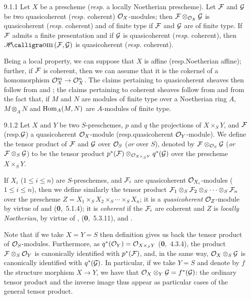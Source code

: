 
\begin{env}[Proposition]{9.1.1}
\label{prop-1.9.1.1}
Let $X$ be a prescheme
(\emph{resp.} a locally Noetherian prescheme). Let $\mathcal{F}$ and $\mathcal{G}$
be two quasicoherent (\emph{resp.} coherent) $\mathcal{O}_X$-modules; then
$\mathcal{F}\otimes_{\mathcal{O}_X}\mathcal{G}$ is quasicoherent (\emph{resp.} coherent) and
of finite type if $\mathcal{F}$ and $\mathcal{G}$ are of finite type. If
$\mathcal{F}$ admits a finite presentation and if $\mathcal{G}$ is quasicoherent
(\emph{resp.} coherent), then $\sheafHom(\sheaf{F},\sheaf{G})$ is quasicoherent
(\emph{resp.} coherent).
\end{env}

Being a local property, we can suppose that $X$ is affine (resp.Noetherian
affine); further, if $\mathcal{F}$ is coherent, then we can assume that it is the
cokernel of a homomorphism $\mathcal{O}_X^m\to\mathcal{O}_X^n$. The claims pertaining to
quasicoherent sheaves then follow from  and ; the
claims pertaining to coherent sheaves follow from  and from the fact
that, if $M$ and $N$ are modules of finite type over a Noetherian ring $A$,
$M\otimes_A N$ and $\operatorname{Hom}_A(M,N)$ are $A$-modules of finite type.

\begin{envr}[Definition]{9.1.2}
\label{defn-1.9.1.2}
Let $X$ and $Y$ be two $S$-preschemes, $p$ and
$q$ the projections of $X\times_S Y$, and $\mathcal{F}$ (resp.$\mathcal{G}$) a
quasicoherent $\mathcal{O}_X$-module (resp.quasicoherent $\mathcal{O}_Y$-module). We define the
tensor product of $\mathcal{F}$ and $\mathcal{G}$ over $\mathcal{O}_S$ (\emph{or} over $S$),
denoted by $\mathcal{F}\otimes_{\mathcal{O}_S}\mathcal{G}$ (\emph{or}
$\mathcal{F}\otimes_S\mathcal{G}$) to be the tensor product
$p^\ast(\mathcal{F})\otimes_{\mathcal{O}_{X\times_S Y}}q^\ast(\mathcal{G})$ over the
prescheme $X\times_S Y$.
\end{envr}

If $X_i$ ($1\leq i\leq n$) are $S$-preschemes, and $\mathcal{F}_i$ are
quasicoherent $\mathcal{O}_{X_i}$-modules ($1\leq i\leq n$), then we define similarly the
tensor product
$\mathcal{F}_1\otimes_S\mathcal{F}_2\otimes_S\cdots\otimes_S\mathcal{F}_n$ over the
prescheme $Z=X_1\times_S X_2\times_S\cdots\times_S X_n$; it is a
\emph{quasicoherent} $\mathcal{O}_Z$-module by virtue of  and
(\textbf{0},~5.1.4); it is \emph{coherent} if the $\mathcal{F}_i$ are coherent and
$Z$ is \emph{locally Noetherian}, by virtue of ,
(\textbf{0},~5.3.11), and .

Note that if we take $X=Y=S$ then definition  gives us back the tensor
product of $\mathcal{O}_S$-modules. Furthermore, as $q^\ast(\mathcal{O}_Y)=\mathcal{O}_{X\times_S Y}$
(\textbf{0},~4.3.4), the product $\mathcal{F}\otimes_S\mathcal{O}_Y$ is canonically
identified with $p^\ast(\mathcal{F})$, and, in the same way,
$\mathcal{O}_X\otimes_S\mathcal{G}$ is canonically identified with $q^\ast(\mathcal{G})$. In
particular, if we take $Y=S$ and denote by $f$ the structure morphism $X\to Y$,
we have that $\mathcal{O}_X\otimes_Y\mathcal{G}=f^\ast(\mathcal{G})$: the ordinary tensor
product and the inverse image thus appear as particular cases of the general
tensor product.

